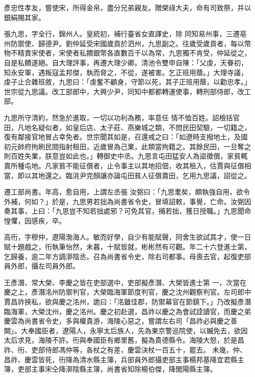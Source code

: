 \begin{pinyinscope}
 彥忠性孝友，嘗使宋，所得金帛，盡分兄弟親友。贈榮祿大夫，命有司致祭，并以銀絹賜其家。



 張九思，字全行，錦州人。皇統初，補行臺省女直譯史，除
 同知易州事，三遷亳州防禦使、歸德尹。劉仲延受宋國歲貢於泗州，九思副之。往歲受歲貢者，每以幣物不精責宋使者，宋使者私饋銀幣各直數百千以為常，九思獨不肯受，仲延從之，自是私饋遂絕。自大理評事，再遷大理少卿。清池令雙申自陳：「父虔，天眷初，知永安軍，遇叛寇孟邦傑，執而脅之，不從，遂被害。乞正班用蔭。」大理寺議，虔子止合雜班敘，九思曰：「虔奮不顧身，守節以死，其子正班用蔭，以勸忠孝。」世宗從九思議。改工部郎中，大興少尹，同知中都都轉運使事，轉刑部侍郎，改工部。



 九思所守清約，然急於進取，一切以功利為務，率意任
 情不恤百姓。詔檢括官田，凡地名疑似者，如皇后店、太子莊、燕樂城之類，不問民田契驗，一切籍之，復有鄰接官地冒占幸免者。世宗聞其如是，召還戒之曰：「如遼時支撥地土，及國初元帥府拘刷民間指射租田，近歲冒為己業，此類當拘籍之。其餘民田，一旦奪之則百姓失業，朕意豈如此也。」轉御史中丞。九思言屯田猛安人為盜徵償，家貧輒賣所種屯地。凡家貧不能征償者，止令事主以其地招佃，收其租入，估賈與征償相當，即以其地還之。臨洮尹完顏讓亦論屯田貧人征償賣田，乞用九思議，詔從之。



 遷工部尚書。年高，愈自用，上謂左丞張
 汝弼曰：「九思耄矣，頗執強自用，欲令外補，何如？」於是，九思男若拙為尚書省令史，冒填詔敕，事覺，亡命。汝弼因奏其事，上曰：「九思豈不知若拙處邪？可免其官，捕若拙，獲日授職。」九思聞命惶懼，因感疾，卒。



 高衎，字穆仲，遼陽渤海人。敏而好學，自少有能賦聲，同舍生欲試其才，使一日賦十題戲之，衎執筆怡然，未暮，十賦皆就，彬彬然有可觀。年二十六登進士第，乞歸養，逾二年方調漷陰丞。召為尚書省令史，除右司都事。母喪去官，起復吏部員外郎，攝左司員外郎。



 王彥潛、常大榮、李慶之皆在吏部選中，吏部擬彥潛、大榮皆進士第
 一，次當在慶之上，彥潛洺州防禦判官，大榮臨海軍節度判官，慶之沈州觀察判官。左司郎中賈昌祚挾私，欲與慶之洺州，詭曰：「洺雖佳郡，防禦幕官在節鎮下。」乃改擬彥潛臨海軍，大榮沈州，慶之洺州。慶之初赴選，昌祚以慶之為會試詮讀官，而慶之弟慶雲為尚書省令史，多與權貴游，海陵心惡之，嘗謂左右司「昌祚必與慶之善闕」。大奉國臣者，遼陽人，永寧太后族人，先為東京警巡院使，以贓免去，欲因太后求見，海陵不許。衎與奉國臣有鄉里舊，擬為貴德縣令。海陵大怒，於是昌祚、衎、吏部侍郎馮仲等，各杖之有差，慶雲決杖一百五十，罷去。
 未幾，仲、昌祚、慶雲皆死，衎降為清水縣主簿，兵部員外郎攝吏部主事楊邦基降宜君縣主簿，吏部主事宋仝降漷陰縣主簿，尚書省知除楊伯傑，降閭陽縣主簿。




\end{pinyinscope}

